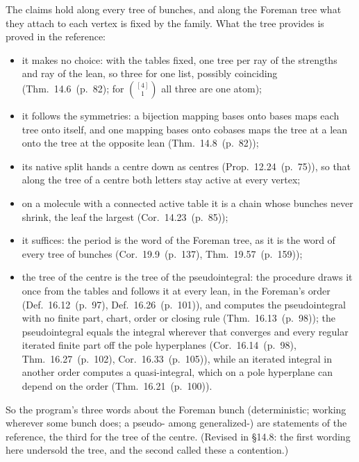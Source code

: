 \documentclass[11pt]{article}
\newcommand{\hb}[2]{#1~(p.~#2)}   %
\theoremstyle{plain}
\theoremstyle{remark}
\begin{document}
The claims hold along every tree of bunches, and along the Foreman tree what they attach to each vertex is fixed by the family. What the tree provides is proved in the reference:
\begin{itemize}
\item it makes no choice: with the tables fixed, one tree per ray of the strengths and ray of the lean, so three for one list, possibly coinciding (Thm.~\hb{14.6}{82}; for $\binom{[4]}1$ all three are one atom);
\item it follows the symmetries: a bijection mapping bases onto bases maps each tree onto itself, and one mapping bases onto cobases maps the tree at a lean onto the tree at the opposite lean (Thm.~\hb{14.8}{82});
\item its native split hands a centre down as centres (Prop.~\hb{12.24}{75}), so that along the tree of a centre both letters stay active at every vertex;
\item on a molecule with a connected active table it is a chain whose bunches never shrink, the leaf the largest (Cor.~\hb{14.23}{85});
\item it suffices: the period is the word of the Foreman tree, as it is the word of every tree of bunches (Cor.~\hb{19.9}{137}, Thm.~\hb{19.57}{159});
\item the tree of the centre is the tree of the pseudointegral: the procedure draws it once from the tables and follows it at every lean, in the Foreman's order (Def.~\hb{16.12}{97}, Def.~\hb{16.26}{101}), and computes the pseudointegral with no finite part, chart, order or closing rule (Thm.~\hb{16.13}{98}); the pseudointegral equals the integral wherever that converges and every regular iterated finite part off the pole hyperplanes (Cor.~\hb{16.14}{98}, Thm.~\hb{16.27}{102}, Cor.~\hb{16.33}{105}), while an iterated integral in another order computes a quasi-integral, which on a pole hyperplane can depend on the order (Thm.~\hb{16.21}{100}).
\end{itemize}
So the program's three words about the Foreman bunch (deterministic; working wherever some bunch does; a pseudo- among generalized-) are statements of the reference, the third for the tree of the centre. (Revised in \S14.8: the first wording here undersold the tree, and the second called these a contention.)
\end{document}
